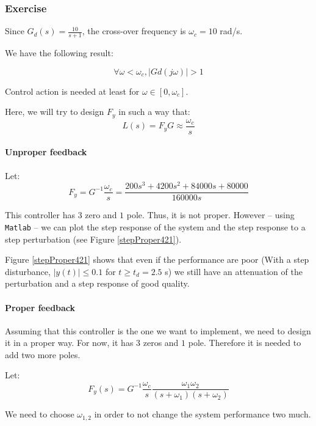 \subsubsection{Exercise}
\label{exo421}

Since $G_d(s) = \frac{10}{s+1}$, the cross-over frequency is $\omega_c = 10$ rad/s.

We have the following result:

$$\forall \omega < \omega_c, |Gd(j\omega)| >1$$

Control action is needed at least for $\omega \in [0,\omega_c]$.

Here, we will try to design $F_y$ in such a way that:
$$L(s) = F_y G \approx \frac{\omega_c}{s}$$

\paragraph{Unproper feedback}
Let:
$$F_y = G^{-1} \frac{\omega_c}{s} = \frac{200 s^3 + 4200 s^2 + 84000 s + 80000}{160000 s}$$

This controller has $3$ zero and $1$ pole.
Thus, it is not proper.
However -- using \texttt{Matlab} -- we can plot the step response of the system and the step response to a step perturbation (see Figure \ref{stepProper421}).

 
Figure \ref{stepProper421} shows that even if the performance are poor (With a step disturbance, $|y(t)| \leq 0.1$ for $t \geq t_d = 2.5$ s) we still have an attenuation of the perturbation and a step response of good quality.

\paragraph{Proper feedback}
Assuming that this controller is the one we want to implement, we need to design it in a proper way.
For now, it has $3$ zeros and $1$ pole.
Therefore it is needed to add two more poles.

Let:
$$F_y(s) = G^{-1}\frac{\omega_c}{s} \frac{\omega_1 \omega_2}{(s+\omega_1)(s+\omega_2)}$$

We need to choose $\omega_{1,2}$ in order to not change the system performance two much.


